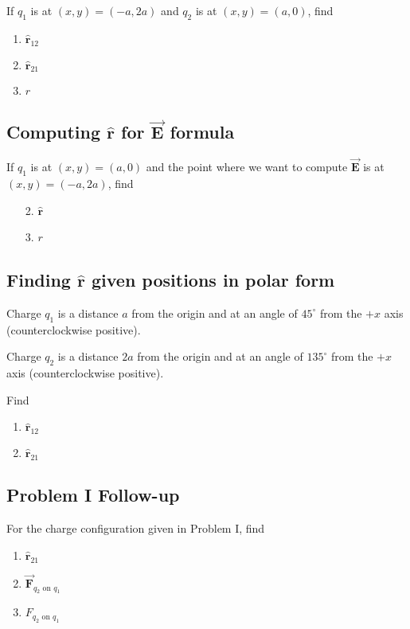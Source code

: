 \documentclass{article}
\newcommand{\rhat}[0]{\hat{\mathbf{r}}}
\newcommand{\bfvec}[1]{\vec{\mathbf{#1}}}
\begin{document}
If $q_1$ is at $(x,y)=(-a,2a)$ and $q_2$ is at $(x,y)=(a,0)$, find

\begin{enumerate}

  \item $\rhat_{12}$

  \item $\rhat_{21}$

  \item $r$

\end{enumerate}

\subsection{Computing $\rhat$ for $\bfvec{E}$ formula}

If $q_1$ is at $(x,y)=(a,0)$ and the point where we want to compute $\bfvec{E}$ is at $(x,y)=(-a,2a)$, find

\begin{enumerate}

  \item[2.] $\rhat$

  \item[3.] $r$

\end{enumerate}

\subsection{Finding $\rhat$ given positions in polar form}

Charge $q_1$ is a distance $a$ from the origin and at an angle of $45^\circ$ from the $+x$ axis (counterclockwise positive).

Charge $q_2$ is a distance $2a$ from the origin and at an angle of $135^\circ$ from the $+x$ axis (counterclockwise positive).

Find

\begin{enumerate}

  \item $\rhat_{12}$

  \item $\rhat_{21}$

\end{enumerate}

\subsection{Problem I Follow-up}

For the charge configuration given in Problem I, find

\begin{enumerate}

  \item $\rhat_{21}$

  \item $\bfvec{F}_{q_2\text{ on }q_1}$

  \item $F_{q_2\text{ on }q_1}$

\end{enumerate}
\end{document}
